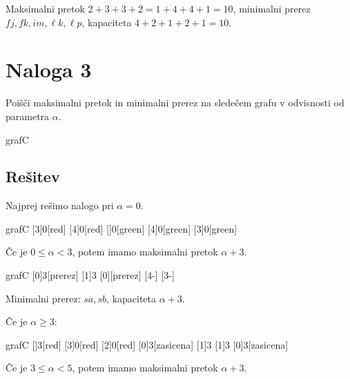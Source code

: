 \documentclass[14pt]{extarticle}
\begin{document}
Maksimalni pretok $2+3+3+2 = 1+4+4+1 = 10$, minimalni prerez $fj, fk, im, \ell k,  \ell p$, kapaciteta $4+2+1+2+1 = 10$.

\clearpage

\section*{Naloga 3}

Poišči maksimalni pretok in minimalni prerez na sledečem grafu v odvisnosti od parametra $\alpha$.

\begin{pretok}{grafC}
\end{pretok}

\subsection*{Rešitev}

Najprej rešimo nalogo pri $\alpha = 0$.

\begin{pretok}{grafC}
    \nicle
    [3]{0}[red]
    [4]{0}[red]
    [\alpha]{0}[green]
    [4]{0}[green]
    [3]{0}[green]
\end{pretok}

\clearpage

Če je $0 \le \alpha < 3$, potem imamo maksimalni pretok $\alpha + 3$.

\begin{pretok}{grafC}
    \nicle
    [0]{3}[prerez]
    [1]{3}
    [0]{\alpha}[prerez]
    [4-\alpha]{\alpha}
    [3-\alpha]{\alpha}

\end{pretok}

Minimalni prerez: $sa, sb$, kapaciteta $\alpha + 3$.

\medskip
Če je $\alpha \ge 3$:

\begin{pretok}{grafC}
    \nicle
    []{3}[red]
    [3]{0}[red]
    [2]{0}[red]
    [0]{3}[zasicena]
    [1]{3}
    [1]{3}
    [0]{3}[zasicena]
\end{pretok}

Če je $3 \le \alpha < 5$, potem imamo maksimalni pretok $\alpha + 3$.
\end{document}
